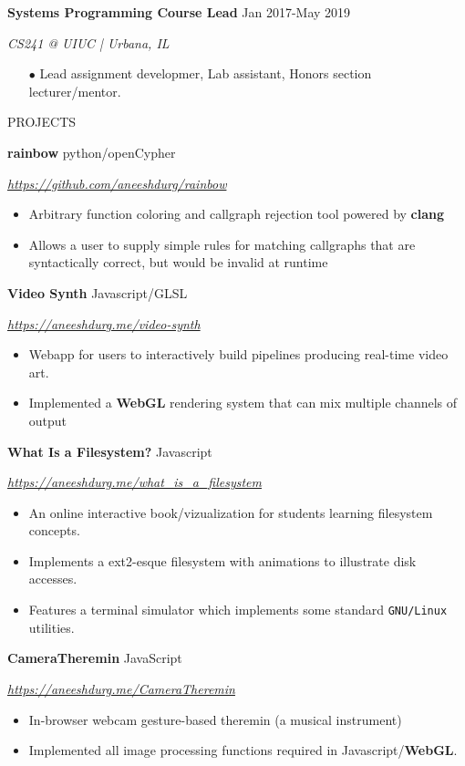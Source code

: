 \documentclass[paper=a4,fontsize=11pt]{scrartcl} %
\newcommand{\sepspace}{\vspace*{1em}}		%
\newcommand{\NewPart}[1]{ \noindent \large \usefont{OT1}{phv}{b}{n}\uppercase{#1} \normalfont \normalsize}
\newcommand{\EducationEntry}[4]{
		\noindent \textbf{#1}     %
			\hfill#2 \par  %
		\noindent \textit{#3} \par        %
		\noindent\hangafter=0 \small #4 %
		\normalsize \par}
\begin{document}
\begin{minipage}[t]{0.78\textwidth}
\EducationEntry{Systems Programming Course Lead}{Jan 2017-May 2019}{CS241 @ UIUC | Urbana, IL}{
\begin{itemize}
  \item[$\bullet$] Lead assignment developmer, Lab assistant, Honors section lecturer/mentor.
\end{itemize}
}

\sepspace
\NewPart{Projects}{}

\EducationEntry{rainbow}{python/openCypher}{\url{https://github.com/aneeshdurg/rainbow}}{
\begin{itemize}
\item Arbitrary function coloring and callgraph rejection tool powered by \textbf{clang}
\item Allows a user to supply simple rules for matching callgraphs that are syntactically correct, but would be invalid at runtime
\end{itemize}
}

\EducationEntry{Video Synth}{Javascript/GLSL}{\url{https://aneeshdurg.me/video-synth}}{
\begin{itemize}
\item Webapp for users to interactively build pipelines producing real-time video art.
\item Implemented a \textbf{WebGL} rendering system that can mix multiple channels of output
\end{itemize}
}

\EducationEntry{What Is a Filesystem?}{Javascript}{\url{https://aneeshdurg.me/what_is_a_filesystem}}{
\begin{itemize}
\item An online interactive book/vizualization for students learning filesystem concepts.
\item Implements a ext2-esque filesystem with animations to illustrate disk accesses.
\item Features a terminal simulator which implements some standard \texttt{GNU/Linux} utilities.%
\end{itemize}
}
\EducationEntry{CameraTheremin}{JavaScript}{\url{https://aneeshdurg.me/CameraTheremin}}{
\begin{itemize}
\item In-browser webcam gesture-based theremin (a musical instrument)
\item Implemented all image processing functions required in Javascript/\textbf{WebGL}.
\end{itemize}
}
\end{minipage}
\end{document}
